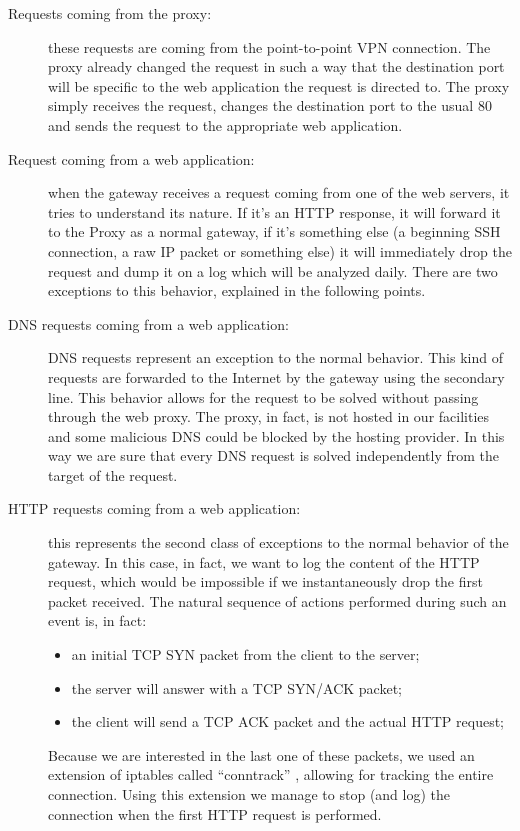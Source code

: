\begin{description}
\item[Requests coming from the proxy: ] these requests are coming from the point-to-point VPN connection. The proxy already changed the request in such a way that the destination port will be specific to the web application the request is directed to. The proxy simply receives the request, changes the destination port to the usual 80 and sends the request to the appropriate web application.

\item[Request coming from a web application: ] when the gateway receives a request coming from one of the web servers, it tries to understand its nature. If it's an HTTP response, it will forward it to the Proxy as a normal gateway, if it's something else (a beginning SSH connection, a raw IP packet or something else) it will immediately drop the request and dump it on a log which will be analyzed daily. There are two exceptions to this behavior, explained in the following points.

\item[DNS requests coming from a web application: ] DNS requests represent an exception to the normal behavior. This kind of requests are forwarded to the Internet by the gateway using the secondary line. This behavior allows for the request to be solved without passing through the web proxy. The proxy, in fact, is not hosted in our facilities and some malicious DNS could be blocked by the hosting provider. In this way we are sure that every DNS request is solved independently from the target of the request.

\item[HTTP requests coming from a web application: ] this represents the second class of exceptions to the normal behavior of the gateway. In this case, in fact, we want to log the content of the HTTP request, which would be impossible if we instantaneously drop the first packet received. The natural sequence of actions performed during such an event is, in fact:
\begin{itemize}
\item an initial TCP SYN packet from the client to the server;
\item the server will answer with a TCP SYN/ACK packet;
\item the client will send a TCP ACK packet and the actual HTTP request;
\end{itemize}
Because we are interested in the last one of these packets, we used an extension of iptables called ``conntrack'' \cite{conntrack}, allowing for tracking the entire connection. Using this extension we manage to stop (and log) the connection when the first HTTP request is performed.
\end{description}

